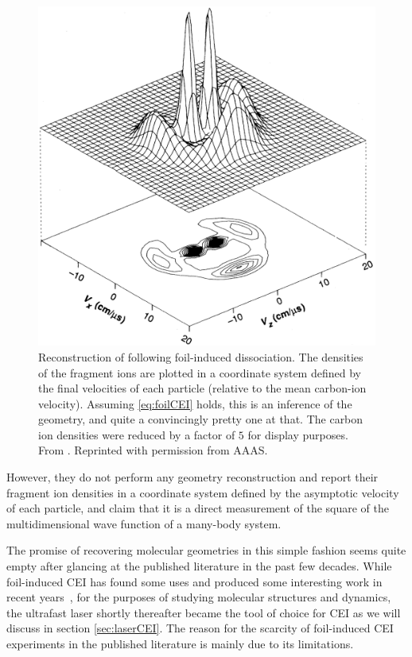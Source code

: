 \begin{figure}
  \centering
  \includegraphics[width=\textwidth]{gfx/VagerPseudoGeometry}
  \caption[Reconstruction of  following foil-induced dissociation.]
  {Reconstruction of  following foil-induced dissociation. The densities of the fragment ions are plotted in a coordinate system defined by the final velocities of each particle (relative to the mean carbon-ion velocity). Assuming \eqref{eq:foilCEI} holds, this is an inference of the geometry, and quite a convincingly pretty one at that. The carbon ion densities were reduced by a factor of $5$ for display purposes. From \citet{Vager89}. Reprinted with permission from AAAS.}
  \label{fig:C2H3geometry}
\end{figure}

However, they do not perform any geometry reconstruction and report their fragment ion densities in a coordinate system defined by the asymptotic velocity of each particle, and claim that it is a direct measurement of the square of the multidimensional wave function of a many-body system.

The promise of recovering molecular geometries in this simple fashion seems quite empty after glancing at the published literature in the past few decades. While foil-induced CEI has found some uses and produced some interesting work in recent years\footnotemark~, for the purposes of studying molecular structures and dynamics, the ultrafast laser shortly thereafter became the tool of choice for CEI as we will discuss in section \ref{sec:laserCEI}. The reason for the scarcity of foil-induced CEI experiments in the published literature is mainly due to its limitations.

